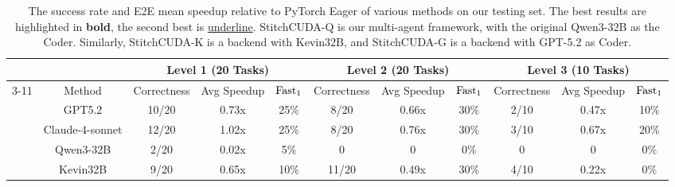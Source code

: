 \begin{table}[h]
\caption{The success rate and E2E mean speedup relative to PyTorch Eager of various methods on our testing set. The best results are highlighted in \textbf{bold}, the second best is \underline{underline}. StitchCUDA-Q is our multi-agent framework, with the original Qwen3-32B as the Coder. Similarly, StitchCUDA-K is a backend with Kevin32B, and StitchCUDA-G is a backend with GPT-5.2 as Coder.}
\label{tab:l3}
{\fontsize{7}{8}\selectfont
\begin{tabular}{c|c|ccc|ccc|ccc}
\hline
                                                                                 &                                    & \multicolumn{3}{c|}{Level 1 (20 Tasks)}                       & \multicolumn{3}{c|}{Level 2 (20 Tasks)}                       & \multicolumn{3}{c}{Level 3 (10 Tasks)}                                                           \\ \cline{3-11} 
\multirow{-2}{*}{Hardware}                                                       & \multirow{-2}{*}{Method}           & Correctness    & Avg Speedup    & $\rm{Fast}_1$           & Correctness    & Avg Speedup    & $\rm{Fast}_1$ & Correctness                 & Avg Speedup                  & $\rm{Fast}_1$                   \\ \hline
                                                                                 & GPT5.2                             & 10/20          & 0.73x          & 25\%          & 8/20           & 0.66x          & 30\%             & 2/10                        & 0.47x                        & 10\%                     \\
                                                                                 & Claude-4-sonnet                    & 12/20          & 1.02x          & 25\%             & 8/20           & 0.76x          & 30\%             & 3/10                        & 0.67x                        & 20\%                     \\
                                                                                 & Qwen3-32B                          & 2/20           & 0.02x          & 5\%           & 0            & 0              & 0\%                & 0                           & 0                            & 0\%                     \\
                                                                                 & Kevin32B                           & 9/20           & 0.65x          & 10\%             & 11/20          & 0.49x          & 30\%             & 4/10                        & 0.22x                        & 0\%                        \\

\end{tabular}}
\end{table}
